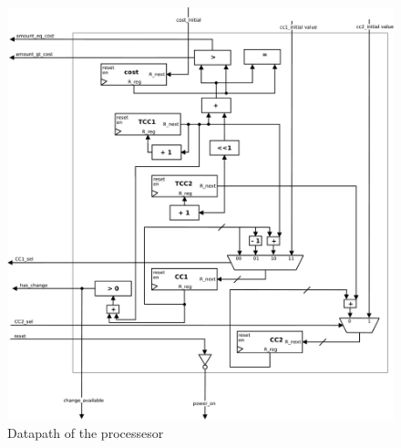 \begin{figure}
\centering
\includegraphics[width=1.0\textwidth]{fig/datapath.pdf}
\caption{Datapath of the processesor}
\label{fig:datapath}
\end{figure}
